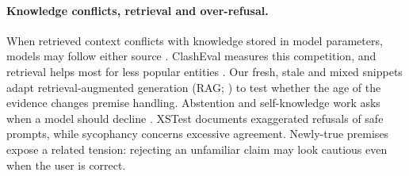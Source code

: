 \paragraph{Knowledge conflicts, retrieval and over-refusal.}
When retrieved context conflicts with knowledge stored in model parameters, models may follow either source \citep{longpre2021entity,xie2024chameleon}. ClashEval \citep{wu2024clasheval} measures this competition, and retrieval helps most for less popular entities \citep{mallen2023popqa}. Our fresh, stale and mixed snippets adapt retrieval-augmented generation (RAG; \citealp{lewis2020rag}) to test whether the age of the evidence changes premise handling. Abstention and self-knowledge work asks when a model should decline \citep{wen2025abstention,kadavath2022know,yin2023dontknow,zhang2024rtuning,pan2025refusal}. XSTest \citep{rottger2024xstest} documents exaggerated refusals of safe prompts, while sycophancy \citep{sharma2024sycophancy} concerns excessive agreement. Newly-true premises expose a related tension: rejecting an unfamiliar claim may look cautious even when the user is correct.
